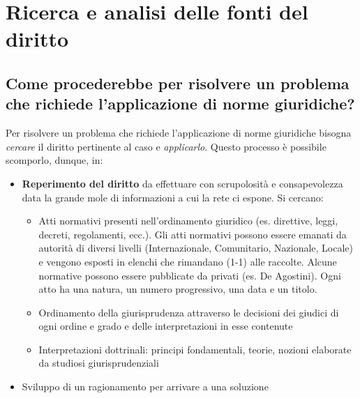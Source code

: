 \newpage
\section{Ricerca e analisi delle fonti del diritto}

\subsection{Come procederebbe per risolvere un problema che richiede l'applicazione di norme giuridiche?}

Per risolvere un problema che richiede l'applicazione di norme giuridiche bisogna \emph{cercare} il diritto pertinente al caso e \emph{applicarlo}.\newline
Questo processo è possibile scomporlo, dunque, in:
\begin{itemize}
    \item \textbf{Reperimento del diritto} da effettuare con scrupolosità e consapevolezza data la grande mole di informazioni a cui
                                           la rete ci espone.\newline
        Si cercano:
        \begin{itemize}
            \item Atti normativi presenti nell'ordinamento giuridico (es. direttive, leggi, decreti, regolamenti, ecc.).\newline
                  Gli atti normativi possono essere emanati da autorità di diversi livelli (Internazionale, Comunitario, Nazionale, Locale)
                  e vengono esposti in elenchi che rimandano (1-1) alle raccolte. Alcune normative possono essere pubblicate da privati (es.
                  De Agostini). \newline
                  Ogni atto ha una natura, un numero progressivo, una data e un titolo.
            \item Ordinamento della giurisprudenza attraverso le decisioni dei giudici di ogni ordine e grado e delle interpretazioni
                  in esse contenute
            \item Interpretazioni dottrinali: principi fondamentali, teorie, nozioni elaborate da studiosi giurisprudenziali
        \end{itemize}
    \item Sviluppo di un ragionamento per arrivare a una soluzione
\end{itemize}


